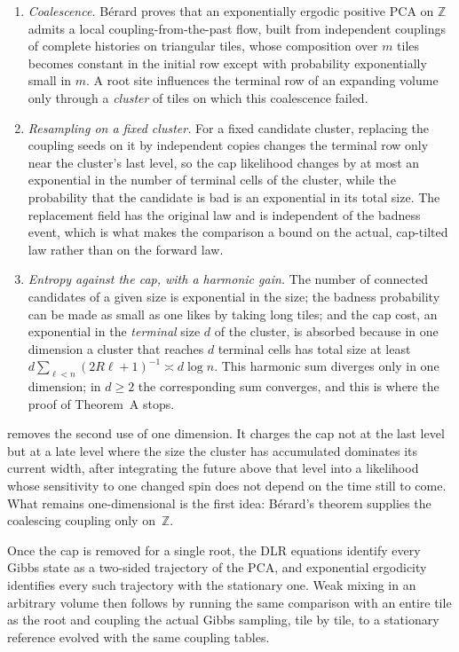 \documentclass[11pt]{article}
\theoremstyle{plain}
\theoremstyle{definition}
\theoremstyle{remark}
\newcommand{\Z}{\mathbb{Z}}
\begin{document}
\begin{enumerate}
\item \emph{Coalescence.} B\'erard \cite{Berard23} proves that an exponentially ergodic positive PCA on $\Z$ admits a local coupling-from-the-past flow, built from independent couplings of complete histories on triangular tiles, whose composition over $m$ tiles becomes constant in the initial row except with probability exponentially small in $m$. A root site influences the terminal row of an expanding volume only through a \emph{cluster} of tiles on which this coalescence failed.
\item \emph{Resampling on a fixed cluster.} For a fixed candidate cluster, replacing the coupling seeds on it by independent copies changes the terminal row only near the cluster's last level, so the cap likelihood changes by at most an exponential in the number of terminal cells of the cluster, while the probability that the candidate is bad is an exponential in its total size. The replacement field has the original law and is independent of the badness event, which is what makes the comparison a bound on the actual, cap-tilted law rather than on the forward law.
\item \emph{Entropy against the cap, with a harmonic gain.} The number of connected candidates of a given size is exponential in the size; the badness probability can be made as small as one likes by taking long tiles; and the cap cost, an exponential in the \emph{terminal} size $d$ of the cluster, is absorbed because in one dimension a cluster that reaches $d$ terminal cells has total size at least $d\sum_{\ell<n}(2R\ell+1)^{-1}\asymp d\log n$. This harmonic sum diverges only in one dimension; in $d\ge2$ the corresponding sum converges, and this is where the proof of Theorem~A stops.
\end{enumerate}
 removes the second use of one dimension. It charges the cap not at the last level but at a late level where the size the cluster has accumulated dominates its current width, after integrating the future above that level into a likelihood whose sensitivity to one changed spin does not depend on the time still to come. What remains one-dimensional is the first idea: B\'erard's theorem supplies the coalescing coupling only on~$\Z$.

Once the cap is removed for a single root, the DLR equations identify every Gibbs state as a two-sided trajectory of the PCA, and exponential ergodicity identifies every such trajectory with the stationary one. Weak mixing in an arbitrary volume then follows by running the same comparison with an entire tile as the root and coupling the actual Gibbs sampling, tile by tile, to a stationary reference evolved with the same coupling tables.
\end{document}
